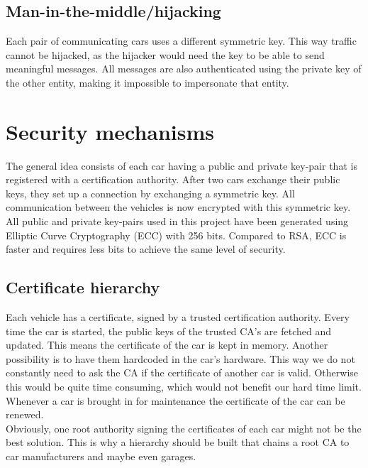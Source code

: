 \documentclass[a4paper, 11pt]{article}
\begin{document}
\subsection{Man-in-the-middle/hijacking} %
Each pair of communicating cars uses a different symmetric key. This way
traffic cannot be hijacked, as the hijacker would need the key to be able
to send meaningful messages. All messages are also authenticated using the
private key of the other entity, making it impossible to impersonate that
entity.

\section{Security mechanisms}
The general idea consists of each car having a public and private key-pair that
is registered with a certification authority. After two cars exchange their
public keys, they set up a connection by exchanging a symmetric key. All
communication between the vehicles is now encrypted with this symmetric key. All public and
private key-pairs used in this project have been generated using Elliptic Curve
Cryptography (ECC) with 256 bits. Compared to RSA, ECC is faster and requires
less bits to achieve the same level of security.

\subsection{Certificate hierarchy}
Each vehicle has a certificate, signed by a trusted certification authority.
Every time the car is started, the public keys of the trusted CA's are fetched
and updated. This means the certificate of the car is kept in memory.
Another possibility is to have them hardcoded in the car's hardware.
This way we do not constantly need to ask the CA if the certificate of another car is
valid. Otherwise this would be quite time consuming, which would not benefit our
hard time limit. Whenever a car is brought in for maintenance the certificate of
the car can be renewed.\\

Obviously, one root authority signing the certificates of each car might not be the best solution.
This is why a hierarchy should be built that chains a root CA to car manufacturers and maybe even garages.
\end{document}
